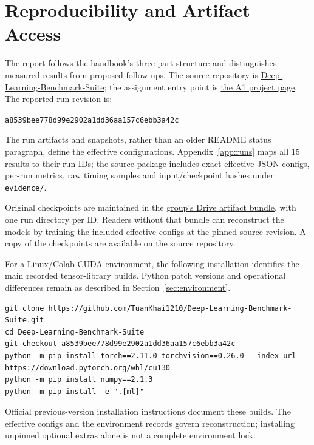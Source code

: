 \section*{Reproducibility and Artifact Access}
The report follows the handbook's three-part structure and distinguishes measured
results from proposed follow-ups.\citep{handbook}
The source repository is
\href{https://github.com/TuanKhai1210/Deep-Learning-Benchmark-Suite}{Deep-Learning-Benchmark-Suite};
the assignment entry point is
\href{https://tuankhai1210.github.io/Deep-Learning-Benchmark-Suite/a1.html}{the A1 project page}.
The reported run revision is:
\begin{center}\small\texttt{a8539bee778d99e2902a1dd36aa157c6ebb3a42c}\end{center}
The run artifacts and snapshots, rather than an older README status paragraph,
define the effective configurations. Appendix~\ref{app:runs} maps all 15 results
to their run IDs; the source package includes exact effective JSON configs,
per-run metrics, raw timing samples and input/checkpoint hashes under
\texttt{evidence/}.

Original checkpoints are maintained in the \href{https://drive.google.com/drive/u/1/folders/13QiG0sOMNTxxGe8er4BesVr4Aky4IL73}{group's Drive artifact bundle}, with one run directory per ID. Readers without that bundle can reconstruct the models by training the included effective configs at the pinned source revision. A copy of the checkpoints are available on the source repository.

For a Linux/Colab CUDA environment, the following installation identifies the
main recorded tensor-library builds. Python patch versions and operational
differences remain as described in Section~\ref{sec:environment}.
\begin{lstlisting}[basicstyle=\ttfamily\footnotesize,breaklines=true,frame=single]
git clone https://github.com/TuanKhai1210/Deep-Learning-Benchmark-Suite.git
cd Deep-Learning-Benchmark-Suite
git checkout a8539bee778d99e2902a1dd36aa157c6ebb3a42c
python -m pip install torch==2.11.0 torchvision==0.26.0 --index-url https://download.pytorch.org/whl/cu130
python -m pip install numpy==2.1.3
python -m pip install -e ".[ml]"
\end{lstlisting}
Official previous-version installation instructions document these builds.\citep{pytorchversions}
The effective configs and the environment records govern reconstruction;
installing unpinned optional extras alone is not a complete environment lock.

